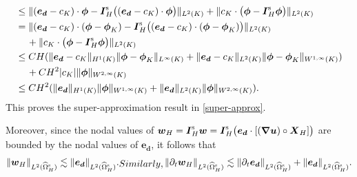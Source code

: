 \documentclass[11pt,reqno]{amsart}
\theoremstyle{definition}
\theoremstyle{plain}
\numberwithin{theorem}{section}
\numberwithin{proposition}{section}
\numberwithin{lemma}{section}
\numberwithin{equation}{section}
\newcommand{\bs}[1]{\boldsymbol{#1}}
\newcommand{\uu}[1]  {{\bs{#1}} }
\newcommand{\dep}{{{\bs{d}}}}
\newcommand{\grad}   { \uu{\nabla}    }
\renewcommand{\(}{\bigl(}
\renewcommand{\)}{\bigr)}
\begin{document}
\begin{itemize}[leftmargin=20pt]
\begin{align*}
&\le \|({\bs e}_\dep-c_K) \cdot {\bs\phi} - {\bs I}_H^{\rm s} \big( ({\bs e}_\dep-c_K) \cdot {\bs\phi}\big)\|_{L^2(K)} 
+ \|c_K \cdot \big({\bs\phi} - {\bs I}_H^{\rm s} {\bs\phi}\big)\|_{L^2(K)} \\
&= \|({\bs e}_\dep-c_K) \cdot ({\bs\phi} - {\bs\phi}_K) - {\bs I}_H^{\rm s} \big( ({\bs e}_\dep-c_K) \cdot ({\bs\phi} - {\bs\phi}_K)\big)\|_{L^2(K)}  \\
&\quad\,
+ \|c_K \cdot \big({\bs\phi} - {\bs I}_H^{\rm s} {\bs\phi}\big)\|_{L^2(K)} \\
&\le CH(\|{\bs e}_\dep-c_K \|_{H^1(K)} \|{\bs\phi}-{\bs\phi}_K\|_{L^{\infty}(K)}
+ \|{\bs e}_\dep-c_K \|_{L^2(K)} \|{\bs\phi}-{\bs\phi}_K\|_{W^{1,\infty}(K)}) \\
&\quad\, + CH^2|c_K|\|{\bs\phi}\|_{W^{2,\infty}(K)}\\
&\le CH^2(\|{\bs e}_\dep \|_{H^1(K)} \|{\bs\phi}\|_{W^{1,\infty}(K)} 
+\|{\bs e}_\dep \|_{L^2(K)} \|{\bs\phi}\|_{W^{2,\infty}(K)}). 
\end{align*}
This proves the super-approximation result in \eqref{super-approx}. 

Moreover, since the nodal values of ${\bs w}_H={\bs I}_H^{\rm s} {\bs w}={\bs I}_H^{\rm s}\big({\bs e}_\dep\cdot[(\grad {\bs u})\circ{\bs X}_H]\big)$ are bounded by the nodal values of ${\bs e}_\dep$, it follows that 
\begin{subequations}\label{wH-L2-dtwH-L2}
\begin{align}
\|{\bs w}_H\|_{L^2(\widehat\Omega_H^{\rm s})} 
\lesssim 
\|{\bs e}_\dep\|_{L^2(\widehat\Omega_H^{\rm s})} .
\end{align}
Similarly,
\begin{align}
\|\partial_t{\bs w}_H\|_{L^2(\widehat\Omega_H^{\rm s})} 
\lesssim 
\|\partial_t{\bs e}_\dep\|_{L^2(\widehat\Omega_H^{\rm s})} 
+ \|{\bs e}_\dep\|_{L^2(\widehat\Omega_H^{\rm s})} .
\end{align}
\end{subequations}


\end{itemize}
\end{document}
